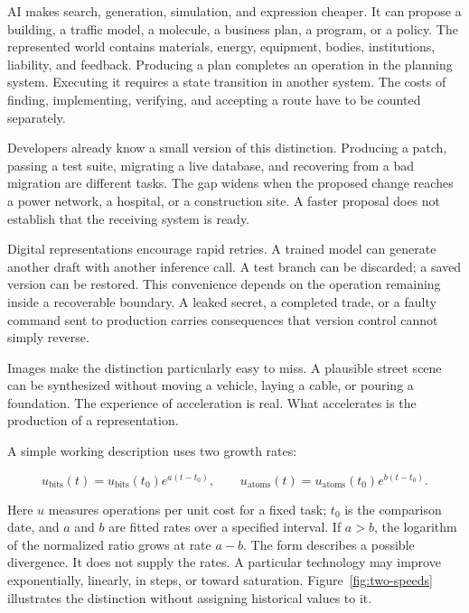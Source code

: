 \documentclass[11pt,openany]{book}
\begin{document}
AI makes search, generation, simulation, and expression cheaper. It can propose a building, a traffic model, a molecule, a business plan, a program, or a policy. The represented world contains materials, energy, equipment, bodies, institutions, liability, and feedback. Producing a plan completes an operation in the planning system. Executing it requires a state transition in another system. The costs of finding, implementing, verifying, and accepting a route have to be counted separately.

Developers already know a small version of this distinction. Producing a patch, passing a test suite, migrating a live database, and recovering from a bad migration are different tasks. The gap widens when the proposed change reaches a power network, a hospital, or a construction site. A faster proposal does not establish that the receiving system is ready.

Digital representations encourage rapid retries. A trained model can generate another draft with another inference call. A test branch can be discarded; a saved version can be restored. This convenience depends on the operation remaining inside a recoverable boundary. A leaked secret, a completed trade, or a faulty command sent to production carries consequences that version control cannot simply reverse.

Images make the distinction particularly easy to miss. A plausible street scene can be synthesized without moving a vehicle, laying a cable, or pouring a foundation. The experience of acceleration is real. What accelerates is the production of a representation.

A simple working description uses two growth rates:

\begin{equation}
u_{\mathrm{bits}}(t)=u_{\mathrm{bits}}(t_0)e^{a(t-t_0)},
\qquad
u_{\mathrm{atoms}}(t)=u_{\mathrm{atoms}}(t_0)e^{b(t-t_0)}.
\end{equation}

Here $u$ measures operations per unit cost for a fixed task; $t_0$ is the comparison date, and $a$ and $b$ are fitted rates over a specified interval. If $a>b$, the logarithm of the normalized ratio grows at rate $a-b$. The form describes a possible divergence. It does not supply the rates. A particular technology may improve exponentially, linearly, in steps, or toward saturation. Figure~\ref{fig:two-speeds} illustrates the distinction without assigning historical values to it.
\end{document}

